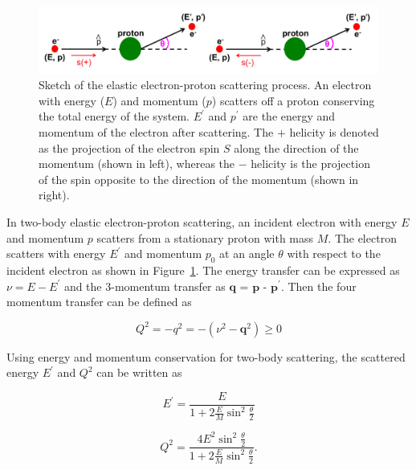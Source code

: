 \begin{singlespace}
\begin{figure}[!h]
	\begin{center}
	\includegraphics[width=15.0cm]{figures/e+p_scattering}
	\end{center}
	\caption
	{Sketch of the elastic electron-proton scattering process. An electron with energy ($E$) and momentum ($p$) scatters off a proton conserving the total energy of the system. $E^{\prime}$ and $p^{\prime}$ are the energy and momentum of the electron after scattering. The $+$ helicity is denoted as the projection of the electron spin $S$ along the direction of the momentum (shown in left), whereas the $-$ helicity is the projection of the spin opposite to the direction of the momentum (shown in right).}
	\label{fig:e-p_scattering}
\end{figure}
\end{singlespace}

In two-body elastic electron-proton scattering, an incident electron with energy $E$ and momentum $p$ scatters from a stationary proton with mass $M$. The electron scatters with energy $E^{\prime}$ and momentum $p_{0}$ at an angle $\theta$ with respect to the incident electron as shown in Figure~\ref{fig:e-p_scattering}. The energy transfer can be expressed as $\nu = E - E^{\prime}$ and the 3-momentum transfer as $\textbf{q}$ = $\textbf{p}$ - $\textbf{p}^{\prime}$. Then the four momentum transfer can be defined as 

\begin{equation} \label{equ:kinQ2_1}
Q^{2} = -q^{2} = -(\nu^{2} - \textbf{q}^{2}) \geq 0
\end{equation}

Using energy and momentum conservation for two-body scattering, the scattered energy $E^{\prime}$ and $Q^{2}$ can be written as

\begin{equation} \label{equ:kinEprime}
E^{\prime} = \frac{E}{ 1 + 2\frac{E}{M}\sin^{2} \frac{\theta}{2} }
\end{equation}

\begin{equation} \label{equ:kinQ2}
Q^{2} = \frac{4E^{2}\sin^{2}\frac{\theta}{2}}{ 1 + 2\frac{E}{M}\sin^{2}\frac{\theta}{2} }.
\end{equation}

